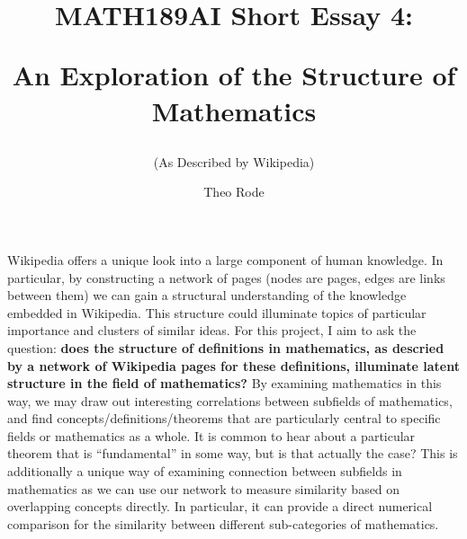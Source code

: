\documentclass[10pt]{paper}
\begin{document}
\title{MATH189AI Short Essay 4: 

An Exploration of the Structure of Mathematics}
\subtitle{(As Described by Wikipedia)}
\author{Theo Rode}



\maketitle

Wikipedia offers a unique look into a large component of human knowledge. In particular, by constructing a network of pages (nodes are pages, edges are links between them) we can gain a structural understanding of the knowledge embedded in Wikipedia. 
This structure could illuminate topics of particular importance and clusters of similar ideas. For this project, I aim to ask the question: \textbf{does the structure of definitions in mathematics, as descried by a network of Wikipedia pages for these definitions, illuminate latent structure in the field of mathematics?}
By examining mathematics in this way, we may draw out interesting correlations between subfields of mathematics, and find concepts/definitions/theorems that are particularly central to specific fields or mathematics as a whole. 
It is common to hear about a particular theorem that is ``fundamental'' in some way, but is that actually the case? This is additionally a unique way of examining connection between subfields in mathematics as we can use our network to measure similarity based on overlapping concepts directly. In particular, it can provide a direct numerical comparison for the similarity between different sub-categories of mathematics. 
\end{document}
